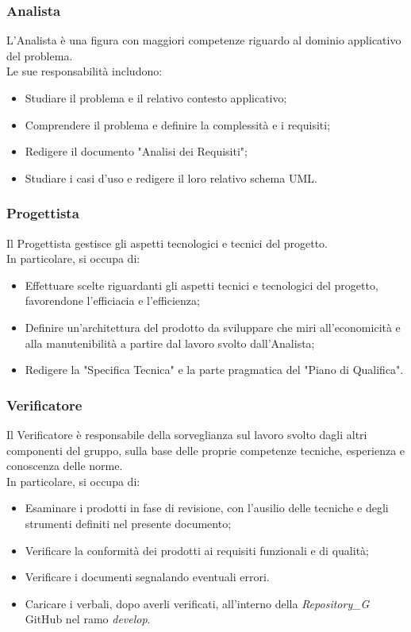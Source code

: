 \documentclass[12pt, oneside]{article}
\begin{document}
\subsubsection{Analista}
L'Analista è una figura con maggiori competenze riguardo al dominio applicativo del problema. \\
Le sue responsabilità includono:
\begin{itemize}
    \item Studiare il problema e il relativo contesto applicativo;
    \item Comprendere il problema e definire la complessità e i requisiti;
    \item Redigere il documento "Analisi dei Requisiti";
    \item Studiare i casi d'uso e redigere il loro relativo schema UML.
\end{itemize}
\subsubsection{Progettista}
Il Progettista gestisce gli aspetti tecnologici e tecnici del progetto. \\
In particolare, si occupa di:
\begin{itemize}
    \item Effettuare scelte riguardanti gli aspetti tecnici e tecnologici del progetto, favorendone l'efficiacia e l'efficienza;
    \item Definire un'architettura del prodotto da sviluppare che miri all'economicità e alla manutenibilità a partire dal lavoro svolto dall'Analista;
    \item Redigere la "Specifica Tecnica" e la parte pragmatica del "Piano di Qualifica".
\end{itemize}
\subsubsection{Verificatore}
Il Verificatore è responsabile della sorveglianza sul lavoro svolto dagli altri componenti del gruppo, sulla base delle proprie competenze tecniche, esperienza e conoscenza delle norme. \\
In particolare, si occupa di:
\begin{itemize}
    \item Esaminare i prodotti in fase di revisione, con l'ausilio delle tecniche e degli strumenti definiti nel presente documento;
    \item Verificare la conformità dei prodotti ai requisiti funzionali e di qualità;
    \item Verificare i documenti segnalando eventuali errori.
    \item Caricare i verbali, dopo averli verificati, all'interno della \textit{Repository_G} GitHub nel ramo \textit{develop}.
\end{itemize}
\end{document}
